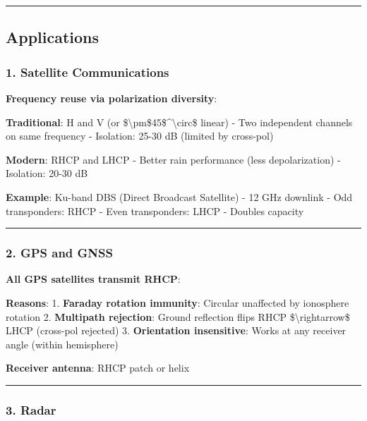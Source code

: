 \begin{center}\rule{0.5\linewidth}{0.5pt}\end{center}

\subsection{Applications}\label{applications}

\subsubsection{1. Satellite
Communications}\label{satellite-communications}

\textbf{Frequency reuse via polarization diversity}:

\textbf{Traditional}: H and V (or
\$\textbackslash pm\$45\$\^{}\textbackslash circ\$ linear) - Two
independent channels on same frequency - Isolation: 25-30 dB (limited by
cross-pol)

\textbf{Modern}: RHCP and LHCP - Better rain performance (less
depolarization) - Isolation: 20-30 dB

\textbf{Example}: Ku-band DBS (Direct Broadcast Satellite) - 12 GHz
downlink - Odd transponders: RHCP - Even transponders: LHCP - Doubles
capacity

\begin{center}\rule{0.5\linewidth}{0.5pt}\end{center}

\subsubsection{2. GPS and GNSS}\label{gps-and-gnss}

\textbf{All GPS satellites transmit RHCP}:

\textbf{Reasons}: 1. \textbf{Faraday rotation immunity}: Circular
unaffected by ionosphere rotation 2. \textbf{Multipath rejection}:
Ground reflection flips RHCP \$\textbackslash rightarrow\$ LHCP
(cross-pol rejected) 3. \textbf{Orientation insensitive}: Works at any
receiver angle (within hemisphere)

\textbf{Receiver antenna}: RHCP patch or helix

\begin{center}\rule{0.5\linewidth}{0.5pt}\end{center}

\subsubsection{3. Radar}\label{radar}

